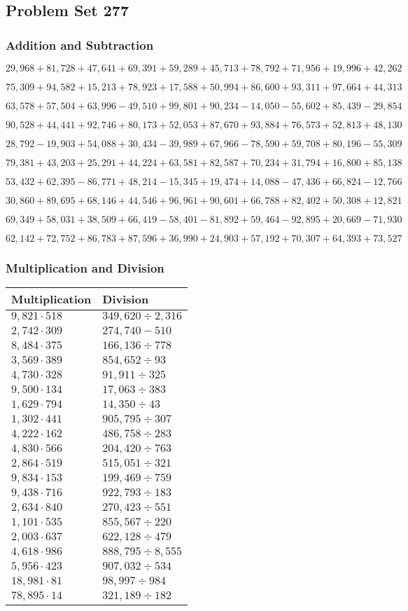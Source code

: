 \hypertarget{problem-set-277}{%
\subsection{Problem Set 277}\label{problem-set-277}}

\hypertarget{addition-and-subtraction}{%
\subsubsection{Addition and
Subtraction}\label{addition-and-subtraction}}

\(29,968+81,728+47,641+69,391+59,289+45,713+78,792+71,956+19,996+42,262\)

\(75,309+94,582+15,213+78,923+17,588+50,994+86,600+93,311+97,664+44,313\)

\(63,578+57,504+63,996-49,510+99,801+90,234-14,050-55,602+85,439-29,854\)

\(90,528+44,441+92,746+80,173+52,053+87,670+93,884+76,573+52,813+48,130\)

\(28,792-19,903+54,088+30,434-39,989+67,966-78,590+59,708+80,196-55,309\)

\(79,381+43,203+25,291+44,224+63,581+82,587+70,234+31,794+16,800+85,138\)

\(53,432+62,395-86,771+48,214-15,345+19,474+14,088-47,436+66,824-12,766\)

\(30,860+89,695+68,146+44,546+96,961+90,601+66,788+82,402+50,308+12,821\)

\(69,349+58,031+38,509+66,419-58,401-81,892+59,464-92,895+20,669-71,930\)

\(62,142+72,752+86,783+87,596+36,990+24,903+57,192+70,307+64,393+73,527\)

\hypertarget{multiplication-and-division}{%
\subsubsection{Multiplication and
Division}\label{multiplication-and-division}}

\begin{longtable}[]{@{}ll@{}}
\toprule
Multiplication & Division\tabularnewline
\midrule
\endhead
\(9,821\cdot518\) & \(349,620 ÷2,316\)\tabularnewline
\(2,742\cdot309\) & \(274,740-510\)\tabularnewline
\(8,484\cdot375\) & \(166,136÷778\)\tabularnewline
\(3,569\cdot389\) & \(854,652÷93\)\tabularnewline
\(4,730\cdot328\) & \(91,911÷325\)\tabularnewline
\(9,500\cdot134\) & \(17,063÷383\)\tabularnewline
\(1,629\cdot794\) & \(14,350÷43\)\tabularnewline
\(1,302\cdot441\) & \(905,795÷307\)\tabularnewline
\(4,222\cdot162\) & \(486,758÷283\)\tabularnewline
\(4,830\cdot566\) & \(204,420÷763\)\tabularnewline
\(2,864\cdot519\) & \(515,051÷321\)\tabularnewline
\(9,834\cdot153\) & \(199,469÷759\)\tabularnewline
\(9,438\cdot716\) & \(922,793÷183\)\tabularnewline
\(2,634\cdot840\) & \(270,423÷551\)\tabularnewline
\(1,101\cdot535\) & \(855,567÷220\)\tabularnewline
\(2,003\cdot637\) & \(622,128÷479\)\tabularnewline
\(4,618\cdot986\) & \(888,795÷8,555\)\tabularnewline
\(5,956\cdot423\) & \(907,032÷534\)\tabularnewline
\(18,981\cdot81\) & \(98,997÷984\)\tabularnewline
\(78,895\cdot14\) & \(321,189÷182\)\tabularnewline
\bottomrule
\end{longtable}
